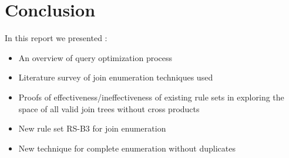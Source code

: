 \chapter{Conclusion}
In this report we presented :
\begin{itemize}
	\item An overview of query optimization process
	\item Literature survey of join enumeration techniques used
	\item Proofs of effectiveness/ineffectiveness of existing rule sets in exploring the space of all valid join trees without cross products
	\item New rule set RS-B3 for join enumeration
	\item New technique for complete enumeration without duplicates 
\end{itemize}